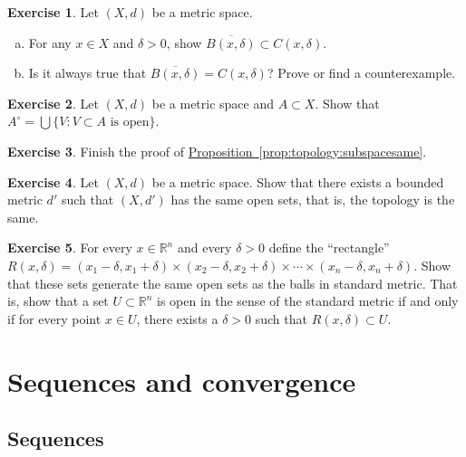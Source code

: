 \documentclass[12pt,openany]{book}
\newcommand{\R}{{\mathbb{R}}}
\theoremstyle{plain}
\theoremstyle{remark}
\theoremstyle{definition}
\newenvironment{exbox}{%
    \def\FrameCommand{\vrule width 1pt \relax\hspace {10pt}}%
    \MakeFramed {\advance \hsize -\width \FrameRestore }%
}{%
    \endMakeFramed
}
\newenvironment{exparts}{%
    \leavevmode\begin{enumerate}[a),noitemsep,topsep=0pt,parsep=0pt,partopsep=0pt]
}{%
    \end{enumerate}
}
\theoremstyle{exercise}
\newtheorem{exercise}{Exercise}[section]
\theoremstyle{example}
\newcommand{\propref}[1]{\hyperref[#1]{Proposition~\ref*{#1}}}
\begin{document}
\begin{exbox}
\begin{samepage}
\begin{exercise}
Let $(X,d)$ be a metric space.
\begin{exparts}
\item
For any $x \in X$ and $\delta > 0$, show
$\overline{B(x,\delta)} \subset C(x,\delta)$.
\item
Is it always true that
$\overline{B(x,\delta)} = C(x,\delta)$?  Prove or find a counterexample.
\end{exparts}
\end{exercise}
\end{samepage}

\begin{exercise}
Let $(X,d)$ be a metric space and $A \subset X$.  Show that
$A^\circ = \bigcup \{ V : V \subset A \text{ is open} \}$.
\end{exercise}

\begin{exercise}
Finish the proof of \propref{prop:topology:subspacesame}.
\end{exercise}

\begin{exercise}
Let $(X,d)$ be a metric space.  Show that there exists a bounded metric
$d'$ such that $(X,d')$ has the same open sets, that is, the topology is
the same.
\end{exercise}

\begin{exercise}
For every $x \in \R^n$ and every $\delta > 0$ define the ``rectangle''
$R(x,\delta) =
(x_1-\delta,x_1+\delta) \times
(x_2-\delta,x_2+\delta) \times \cdots \times
(x_n-\delta,x_n+\delta)$.  Show that these sets generate the same open
sets as the balls in standard metric.  That is, show that a set $U \subset \R^n$
is open in the sense of the standard metric if and only if for every
point $x \in U$, there exists a $\delta > 0$ such that $R(x,\delta) \subset
U$.
\end{exercise}
\end{exbox}


\section{Sequences and convergence}
\label{sec:metseqs}

\subsection{Sequences}
\end{document}
